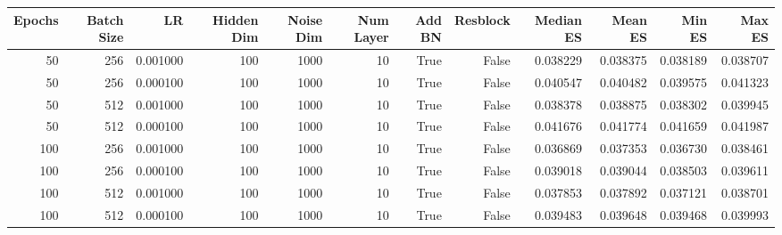 \begin{tabular}{rrrrrrrrrrrr}
\toprule
Epochs & Batch Size & LR & Hidden Dim & Noise Dim & Num Layer & Add BN & Resblock & Median ES & Mean ES & Min ES & Max ES \\
\midrule
50 & 256 & 0.001000 & 100 & 1000 & 10 & True & False & 0.038229 & 0.038375 & 0.038189 & 0.038707 \\
50 & 256 & 0.000100 & 100 & 1000 & 10 & True & False & 0.040547 & 0.040482 & 0.039575 & 0.041323 \\
50 & 512 & 0.001000 & 100 & 1000 & 10 & True & False & 0.038378 & 0.038875 & 0.038302 & 0.039945 \\
50 & 512 & 0.000100 & 100 & 1000 & 10 & True & False & 0.041676 & 0.041774 & 0.041659 & 0.041987 \\
100 & 256 & 0.001000 & 100 & 1000 & 10 & True & False & 0.036869 & 0.037353 & 0.036730 & 0.038461 \\
100 & 256 & 0.000100 & 100 & 1000 & 10 & True & False & 0.039018 & 0.039044 & 0.038503 & 0.039611 \\
100 & 512 & 0.001000 & 100 & 1000 & 10 & True & False & 0.037853 & 0.037892 & 0.037121 & 0.038701 \\
100 & 512 & 0.000100 & 100 & 1000 & 10 & True & False & 0.039483 & 0.039648 & 0.039468 & 0.039993 \\
\bottomrule
\end{tabular}

